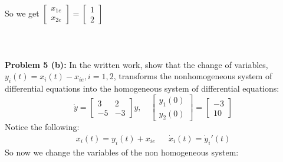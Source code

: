 \documentclass[12pt]{article}
\begin{document}
So we get $\begin{bmatrix} x_{1e} \\ x_{2e}\end{bmatrix} = \begin{bmatrix} 1 \\ 2\end{bmatrix}$ 
\\ \\ \\ \\
\noindent \textbf{Problem 5 (b): }In the written work, show that the change of variables,$y_i(t) = x_i(t) - x_{ie}, i = 1,2$, transforms the nonhomogeneous system of differential equations into the homogeneous system of differential equations:
$$
\dot{y}
=
\left\lbrack
\begin{array}{rr}
	3 & 2 \\
	-5 & -3
\end{array}
\right\rbrack y, \quad
\left\lbrack
\begin{array}{r}
	y_1(0) \\
	y_2(0)
\end{array}
\right\rbrack
=
\left\lbrack
\begin{array}{r}
	-3 \\
	10
\end{array}
\right\rbrack
$$
Notice the following:
	\begin{align*}
		x_i(t) = y_i(t) + x_{ie} && \dot{x}_i(t) = \dot{y}_i'(t)
	\end{align*}
So now we change the variables of the non homogeneous system:
\end{document}
